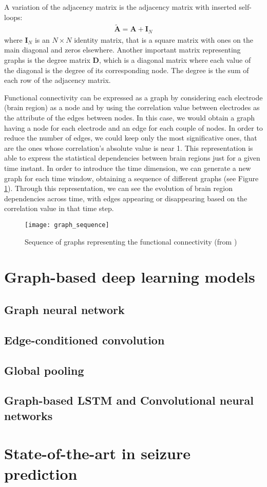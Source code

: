 A variation of the adjacency matrix is the adjacency matrix with inserted self-loops:
\begin{align*}
    \tilde{\mathbf{A}} = \mathbf{A} + \mathbf{I}_N
\end{align*}
where $\mathbf{I}_N$ is an $N \times N$ identity matrix, that is a square matrix with ones on the main diagonal and zeros elsewhere. Another important matrix representing graphs is the degree matrix $\mathbf{D}$, which is a diagonal matrix where each value of the diagonal is the degree of its corresponding node. The degree is the sum of each row of the adjacency matrix.

Functional connectivity can be expressed as a graph by considering each electrode (brain region) as a node and by using the correlation value between electrodes as the attribute of the edges between nodes. In this case, we would obtain a graph having a node for each electrode and an edge for each couple of nodes. In order to reduce the number of edges, we could keep only the most significative ones, that are the ones whose correlation's absolute value is near 1. This representation is able to express the statistical dependencies between brain regions just for a given time instant. In order to introduce the time dimension, we can generate a new graph for each time window, obtaining a sequence of different graphs (see Figure \ref{fig:graph_sequence}). Through this representation, we can see the evolution of brain region dependencies across time, with edges appearing or disappearing based on the correlation value in that time step.
\begin{figure}[htbp]
    \centering
    \texttt{[image: graph\_sequence]}
    \caption{Sequence of graphs representing the functional connectivity (from \cite{arXiv:graphstream})}
    \label{fig:graph_sequence}
\end{figure}

\section{Graph-based deep learning models}
\subsection{Graph neural network}
\subsection{Edge-conditioned convolution}
\subsection{Global pooling}
\subsection{Graph-based LSTM and Convolutional neural networks}

\section{State-of-the-art in seizure prediction}